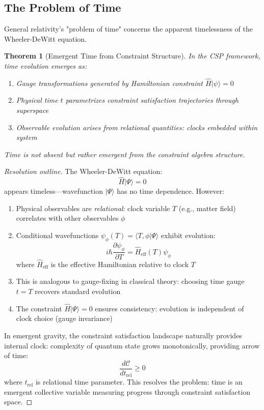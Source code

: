 \documentclass[11pt,a4paper]{article}
\newtheorem{theorem}{Theorem}[section]
\theoremstyle{remark}
\theoremstyle{definition}
\begin{document}
\subsection{The Problem of Time}

General relativity's "problem of time" concerns the apparent timelessness of the Wheeler-DeWitt equation.

\begin{theorem}[Emergent Time from Constraint Structure]
In the CSP framework, time evolution emerges as:
\begin{enumerate}[label=(\roman*)]
\item Gauge transformations generated by Hamiltonian constraint $\hat{H}|\psi\rangle = 0$
\item Physical time $t$ parametrizes constraint satisfaction trajectories through superspace
\item Observable evolution arises from relational quantities: clocks embedded within system
\end{enumerate}
Time is not absent but rather emergent from the constraint algebra structure.
\end{theorem}

\begin{proof}[Resolution outline]
The Wheeler-DeWitt equation:
\begin{equation}
\hat{H}|\Psi\rangle = 0
\end{equation}
appears timeless—wavefunction $|\Psi\rangle$ has no time dependence. However:

\begin{enumerate}
\item Physical observables are \emph{relational}: clock variable $T$ (e.g., matter field) correlates with other observables $\phi$
\item Conditional wavefunctions $\psi_\phi(T) = \langle T, \phi|\Psi\rangle$ exhibit evolution:
\begin{equation}
i\hbar \frac{\partial \psi_\phi}{\partial T} = \hat{H}_{\text{eff}}(T) \psi_\phi
\end{equation}
where $\hat{H}_{\text{eff}}$ is the effective Hamiltonian relative to clock $T$

\item This is analogous to gauge-fixing in classical theory: choosing time gauge $t = T$ recovers standard evolution
\item The constraint $\hat{H}|\Psi\rangle = 0$ ensures consistency: evolution is independent of clock choice (gauge invariance)
\end{enumerate}

In emergent gravity, the constraint satisfaction landscape naturally provides internal clock: complexity of quantum state grows monotonically, providing arrow of time:
\begin{equation}
\frac{d\mathcal{C}}{dt_{\text{rel}}} \geq 0
\end{equation}
where $t_{\text{rel}}$ is relational time parameter. This resolves the problem: time is an emergent collective variable measuring progress through constraint satisfaction space.
\end{proof}
\end{document}
